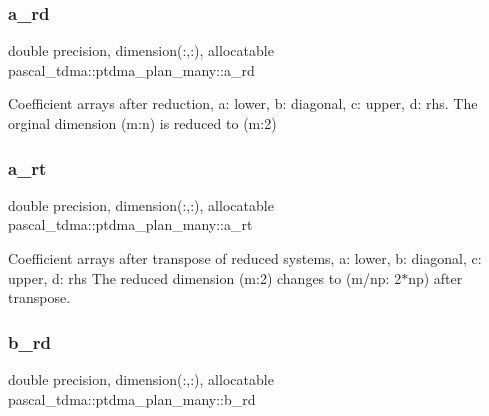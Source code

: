 \subsubsection{\texorpdfstring{a\+\_\+rd}{a\_rd}}
{\footnotesize\ttfamily double precision, dimension(\+:,\+:), allocatable pascal\+\_\+tdma\+::ptdma\+\_\+plan\+\_\+many\+::a\+\_\+rd}



Coefficient arrays after reduction, a\+: lower, b\+: diagonal, c\+: upper, d\+: rhs. The orginal dimension (m\+:n) is reduced to (m\+:2) 

\mbox{\label{structpascal__tdma_1_1ptdma__plan__many_a42be039aee75c5393c22111cf232e77d}} 
\subsubsection{\texorpdfstring{a\+\_\+rt}{a\_rt}}
{\footnotesize\ttfamily double precision, dimension(\+:,\+:), allocatable pascal\+\_\+tdma\+::ptdma\+\_\+plan\+\_\+many\+::a\+\_\+rt}



Coefficient arrays after transpose of reduced systems, a\+: lower, b\+: diagonal, c\+: upper, d\+: rhs The reduced dimension (m\+:2) changes to (m/np\+: 2$\ast$np) after transpose. 

\mbox{\label{structpascal__tdma_1_1ptdma__plan__many_a81ed1b6910c30334e93598f7d18254a3}} 
\subsubsection{\texorpdfstring{b\+\_\+rd}{b\_rd}}
{\footnotesize\ttfamily double precision, dimension(\+:,\+:), allocatable pascal\+\_\+tdma\+::ptdma\+\_\+plan\+\_\+many\+::b\+\_\+rd}

\mbox{\label{structpascal__tdma_1_1ptdma__plan__many_aab84eff7c823d47acb5388cd4e2a790a}} 
